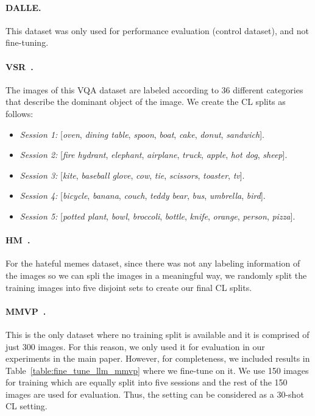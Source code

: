 \paragraph{DALLE.} This dataset was only used for performance evaluation (control dataset), and not fine-tuning.

\paragraph{VSR~\cite{Liu2022VisualSR}.} The images of this VQA dataset are labeled according to 36 different categories that describe the dominant object of the image. We create the CL splits as follows:
\begin{itemize}
    \item \emph{Session 1:} [\textit{oven}, \textit{dining table}, \textit{spoon}, \textit{boat}, \textit{cake}, \textit{donut}, \textit{sandwich}].
    \item \emph{Session 2:} [\textit{fire hydrant}, \textit{elephant}, \textit{airplane}, \textit{truck}, \textit{apple}, \textit{hot dog}, \textit{sheep}].
    \item \emph{Session 3:} [\textit{kite}, \textit{baseball glove}, \textit{cow}, \textit{tie}, \textit{scissors}, \textit{toaster}, \textit{tv}].
    \item \emph{Session 4:} [\textit{bicycle}, \textit{banana}, \textit{couch}, \textit{teddy bear}, \textit{bus}, \textit{umbrella}, \textit{bird}].
    \item \emph{Session 5:} [\textit{potted plant}, \textit{bowl}, \textit{broccoli}, \textit{bottle}, \textit{knife}, \textit{orange}, \textit{person}, \textit{pizza}].
\end{itemize}

\paragraph{HM~\cite{kiela2020hateful}.} For the hateful memes dataset, since there was not any labeling information of the images so we can spli the images in a meaningful way, we randomly split the training images into five disjoint sets to create our final CL splits.

\paragraph{MMVP~\cite{tong2024eyes}.} This is the only dataset where no training split is available and it is comprised of just 300 images. For this reason, we only used it for evaluation in our experiments in the main paper. However, for completeness, we included results in Table~\ref{table:fine_tune_llm_mmvp} where we fine-tune on it. We use 150 images for training which are equally split into five sessions and the rest of the 150 images are used for evaluation. Thus, the setting can be considered as a 30-shot CL setting. 

